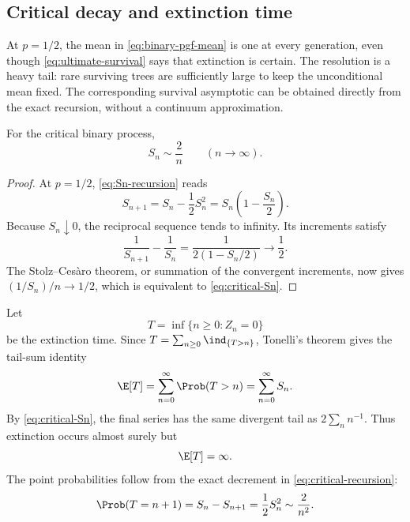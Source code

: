 \subsection{Critical decay and extinction time}
\label{sec:critical-gw}

At \(p=1/2\), the mean in \cref{eq:binary-pgf-mean} is one at every generation,
even though \cref{eq:ultimate-survival} says that extinction is certain.  The
resolution is a heavy tail: rare surviving trees are sufficiently large to keep the
unconditional mean fixed.  The corresponding survival asymptotic can be obtained
directly from the exact recursion, without a continuum approximation.

\begin{proposition}
\label{prop:critical-survival}
For the critical binary process,
\begin{equation}
  S_n\sim\frac{2}{n}
  \qquad(n\to\infty).
  \label{eq:critical-Sn}
\end{equation}
\end{proposition}

\begin{proof}
At \(p=1/2\), \cref{eq:Sn-recursion} reads
\begin{equation}
  S_{n+1}=S_n-\frac12S_n^2=S_n\left(1-\frac{S_n}{2}\right).
  \label{eq:critical-recursion}
\end{equation}
Because \(S_n\downarrow0\), the reciprocal sequence tends to infinity.  Its
increments satisfy
\begin{equation}
  \frac{1}{S_{n+1}}-\frac{1}{S_n}
  =\frac{1}{2(1-S_n/2)}\longrightarrow\frac12.
  \label{eq:reciprocal-increment}
\end{equation}
The Stolz--Ces\`aro theorem, or summation of the convergent increments, now gives
\((1/S_n)/n\to1/2\), which is equivalent to \cref{eq:critical-Sn}.
\end{proof}

Let
\begin{equation}
  T=\inf\{n\geq0:Z_n=0\}
  \label{eq:extinction-time}
\end{equation}
be the extinction time.  Since \(T=\sum_{n\geq0}\ind_{\{T>n\}}\), Tonelli's theorem
gives the tail-sum identity
\begin{equation}
  \E[T]=\sum_{n=0}^{\infty}\Prob(T>n)
       =\sum_{n=0}^{\infty}S_n.
  \label{eq:mean-extinction-tail-sum}
\end{equation}
By \cref{eq:critical-Sn}, the final series has the same divergent tail as
\(2\sum_n n^{-1}\).  Thus extinction occurs almost surely but
\begin{equation}
  \E[T]=\infty.
  \label{eq:critical-infinite-lifetime}
\end{equation}
The point probabilities follow from the exact decrement in
\cref{eq:critical-recursion}:
\begin{equation}
  \Prob(T=n+1)=S_n-S_{n+1}=\frac12S_n^2
  \sim\frac{2}{n^2}.
  \label{eq:critical-T-tail}
\end{equation}

